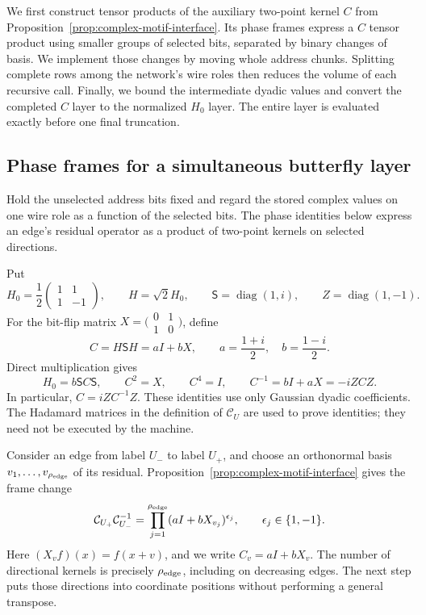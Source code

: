 \documentclass[11pt]{article}
\theoremstyle{definition}
\begin{document}
We first construct tensor products of the auxiliary two-point kernel
$C$ from Proposition~\ref{prop:complex-motif-interface}. Its phase
frames express a $C$ tensor product using smaller groups of
selected bits, separated by binary changes of basis. We implement those
changes by moving whole address chunks. Splitting complete rows among
the network's wire roles then reduces the volume of each recursive
call. Finally, we bound the intermediate dyadic values and convert the
completed $C$ layer to the normalized $H_0$ layer. The entire layer is
evaluated exactly before one final truncation.

\subsection{Phase frames for a simultaneous butterfly layer}
\label{subsec:phase-frames}

Hold the unselected address bits fixed and regard the stored complex
values on one wire role as a function of the selected bits.  The phase
identities below express an edge's residual operator as a product of
two-point kernels on selected directions.

Put
\[
 H_0=\frac12\begin{pmatrix}1&1\\1&-1\end{pmatrix},\qquad
 H=\sqrt2 H_0,\qquad \mathsf S=\operatorname{diag}(1,i),\qquad
 Z=\operatorname{diag}(1,-1).
\]
For the bit-flip matrix $X=\bigl(\begin{smallmatrix}0&1\\1&0\end{smallmatrix}\bigr)$,
define
\begin{equation}\label{eq:phase-C}
 C=H\mathsf SH=aI+bX,\qquad a=\frac{1+i}{2},\quad b=\frac{1-i}{2}.
\end{equation}
Direct multiplication gives
\begin{equation}\label{eq:phase-basic-identities}
 H_0=b\mathsf SC\mathsf S,\qquad C^2=X,\qquad C^4=I,\qquad
 C^{-1}=bI+aX=-iZCZ.
\end{equation}
In particular, $C=iZC^{-1}Z$.  These identities use only Gaussian dyadic
coefficients.  The Hadamard matrices in the definition of
$\mathcal C_U$ are used to prove identities; they need not be executed
by the machine.

Consider an edge from label $U_-$ to label $U_+$, and choose an
orthonormal basis $v_1,\ldots,v_{\rho_{\rm edge}}$ of its residual.
Proposition~\ref{prop:complex-motif-interface} gives the frame change
\[
 \mathcal C_{U_+}\mathcal C_{U_-}^{-1}
 =\prod_{j=1}^{\rho_{\rm edge}}(aI+bX_{v_j})^{\epsilon_j},
 \qquad \epsilon_j\in\{1,-1\}.
\]
Here $(X_vf)(x)=f(x+v)$, and we write $C_v=aI+bX_v$.
The number of directional kernels is precisely
$\rho_{\rm edge}$, including on decreasing edges. The next step puts those directions
into coordinate positions without performing a general transpose.
\end{document}
